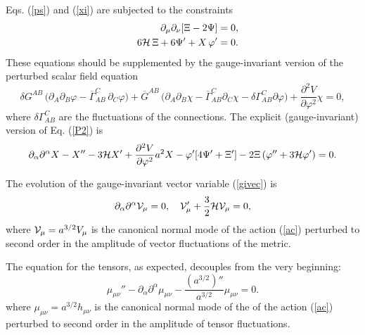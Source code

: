 \documentclass[a4paper,12pt]{article}
\begin{document}
Eqs. (\ref{ps}) and (\ref{xi}) are subjected to the constraints 
\begin{eqnarray}
&&\partial_{\mu}\partial_{\nu}[ \Xi - 2 \Psi] =0,
\label{con1}\\
&& 6 {\cal H}\, \Xi + 6 \Psi' + X \,\varphi' =0.
\label{con3}
\end{eqnarray}
These equations should be 
supplemented by the gauge-invariant version of the 
 perturbed scalar field equation 
\begin{equation}
\delta G^{A B} \,\biggl( \partial_{A} \partial_{B} \varphi -
\overline{\Gamma}_{A B}^{C}\, \partial_{C} \varphi \biggr) 
+ \overline{G}^{A B} \,\biggl( \partial_{A} \partial_{B} \chi - 
\overline{\Gamma}_{A B}^{C} \partial_{C} \chi  - \delta 
\Gamma^{C}_{A B} \partial\varphi\biggr) 
+ \frac{\partial^2 V}{\partial \varphi^2}\chi=0,
\label{P2}
\end{equation}
where $ \delta \Gamma^{C}_{A B}$ are the fluctuations of the connections.
The explicit (gauge-invariant)  version of Eq. (\ref{P2}) is 
\begin{equation}
\partial_{\alpha} \partial^{\alpha} X - X'' - 3 {\cal H} X' + 
\frac{ \partial^2 V}{\partial\varphi^2} a^2 X - 
\varphi' [ 4 \Psi' + \Xi'] - 2 \Xi\,( \varphi'' + 3 {\cal H} \varphi') =0.
\label{ch}
\end{equation}

The evolution of the gauge-invariant vector variable (\ref{givec}) is 
\begin{equation}
\partial_{\alpha} \partial^{\alpha} {\cal V}_{\mu} =0,\,\,\,\,\,\,
{\cal V}_{\mu}' + 
\frac{3}{2} {\cal H} {\cal V}_{\mu}=0,
\label{calV}
\end{equation}
where ${\cal V}_{\mu} = a^{3/2} V_{\mu}$ is the canonical 
normal mode of the action (\ref{ac}) perturbed to second order in the 
amplitude of vector fluctuations of the metric. 

The equation for the 
tensors, as expected, decouples from the very beginning:
\begin{equation}
\mu_{\mu\nu}'' - \partial_{\alpha}\partial^{\alpha} \mu_{\mu\nu} 
- \frac{(a^{3/2})''}{a^{3/2}} \mu_{\mu\nu} =0.
\label{mu}
\end{equation}
where $\mu_{\mu\nu} =a^{3/2} h_{\mu\nu}$ is the canonical 
normal mode of the of the action (\ref{ac}) perturbed to second order 
in the amplitude of tensor fluctuations.
\end{document}
